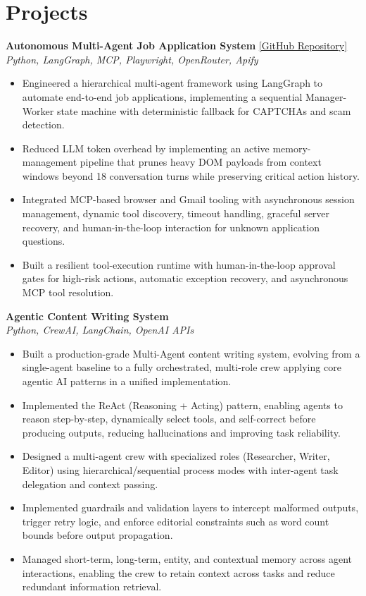 \documentclass[10pt, letterpaper]{article}
\begin{document}
\section{Projects}
\textbf{Autonomous Multi-Agent Job Application System} \hfill \href{https://github.com/Jaswanth19-596/Autonomous_Multi_Agent_Job_Application_System}{[GitHub Repository]} \\
\textit{Python, LangGraph, MCP, Playwright, OpenRouter, Apify}
\begin{itemize}
    \item Engineered a hierarchical multi-agent framework using LangGraph to automate end-to-end job applications, implementing a sequential Manager-Worker state machine with deterministic fallback for CAPTCHAs and scam detection.
    \item Reduced LLM token overhead by implementing an active memory-management pipeline that prunes heavy DOM payloads from context windows beyond 18 conversation turns while preserving critical action history.
    \item Integrated MCP-based browser and Gmail tooling with asynchronous session management, dynamic tool discovery, timeout handling, graceful server recovery, and human-in-the-loop interaction for unknown application questions.
    \item Built a resilient tool-execution runtime with human-in-the-loop approval gates for high-risk actions, automatic exception recovery, and asynchronous MCP tool resolution.
\end{itemize}

\textbf{Agentic Content Writing System} \\
\textit{Python, CrewAI, LangChain, OpenAI APIs}
\begin{itemize}
    \item Built a production-grade Multi-Agent content writing system, evolving from a single-agent baseline to a fully orchestrated, multi-role crew applying core agentic AI patterns in a unified implementation.
    \item Implemented the ReAct (Reasoning + Acting) pattern, enabling agents to reason step-by-step, dynamically select tools, and self-correct before producing outputs, reducing hallucinations and improving task reliability.
    \item Designed a multi-agent crew with specialized roles (Researcher, Writer, Editor) using hierarchical/sequential process modes with inter-agent task delegation and context passing.
    \item Implemented guardrails and validation layers to intercept malformed outputs, trigger retry logic, and enforce editorial constraints such as word count bounds before output propagation.
    \item Managed short-term, long-term, entity, and contextual memory across agent interactions, enabling the crew to retain context across tasks and reduce redundant information retrieval.
\end{itemize}
\end{document}
